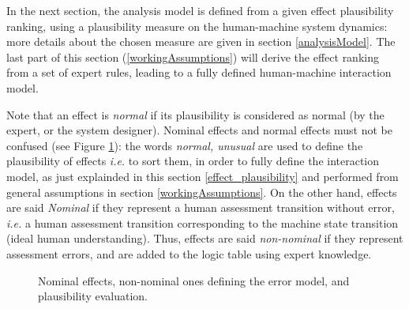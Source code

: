 In the next section, the analysis model is defined from a given effect plausibility ranking, using a plausibility measure on the human-machine system dynamics:
more details about the chosen measure are given in section \ref{analysisModel}.
The last part of this section (\ref{workingAssumptions}) will derive the effect ranking from a set of expert rules, leading to a fully defined human-machine interaction model.  

Note that an effect is {\em normal} if its plausibility is considered as normal (by the expert, or the system designer).
Nominal effects and normal effects must not be confused 
(see Figure \ref{nominalNormal}): 
the words {\em normal, unusual} are used to define the plausibility 
of effects \textit{i.e.} to sort them, in order to
fully define the interaction model, 
as just explainded in this section \ref{effect_plausibility} 
and performed from general assumptions in section \ref{workingAssumptions}. 
On the other hand, effects are said {\em Nominal} if they represent a human assessment 
transition without error, \textit{i.e.}
a human assessment transition corresponding to the machine state 
transition (ideal human understanding). 
Thus, effects are said {\em non-nominal} 
if they represent assessment errors, and
are added to the logic table using expert knowledge.

\begin{figure}
        \centering
{}
        \caption{Nominal effects, non-nominal ones defining the error model, and plausibility evaluation.}
        \label{nominalNormal}
\end{figure}


